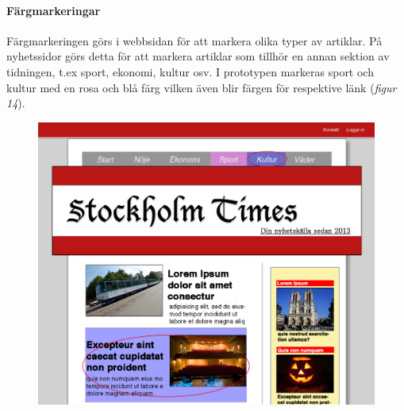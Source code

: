 \documentclass[11pt]{article}
\begin{document}
\paragraph{Färgmarkeringar}\mbox{}

Färgmarkeringen görs i webbsidan för att markera olika typer av artiklar. På nyhetssidor görs detta för att markera artiklar som tillhör en annan sektion av tidningen, t.ex sport, ekonomi, kultur osv. I prototypen markeras sport och kultur med en rosa och blå färg vilken även blir färgen för respektive länk (\textit{figur 14}).
\\

\begin{figure}[H]
\centerline{%
\includegraphics[scale=0.25]{pics/fargdesktop.png}\hspace{2em}%
}
\end{figure}
\end{document}
